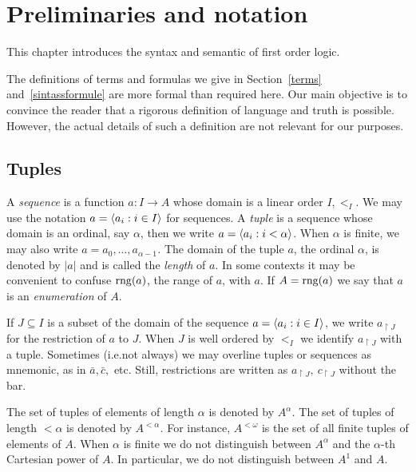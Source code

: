 \chapter{Preliminaries and notation}\label{termini}
This chapter introduces the syntax and semantic of first order logic.

The definitions of terms and formulas we give in Section~\ref{terms} and~\ref{sintassformule} are more formal than required here.
Our main objective is to convince the reader that a rigorous definition of language and truth is possible.
However, the actual details of such a definition are not relevant for our purposes.



\section{Tuples}

A \emph{sequence\/} is a function  $a:I\to A$ whose domain is a linear order $I,<_I$.
We may use the notation \emph{$a=\langle a_i: i\in I\rangle$} for sequences.
A \emph{tuple\/} is a sequence whose domain is an ordinal, say $\alpha$, then we write  $a=\langle a_i: i<\alpha\rangle$.
When $\alpha$ is finite, we may also write \emph{$a=a_0,\dots,a_{\alpha-1}$.}
The domain of the tuple $a$, the ordinal $\alpha$, is denoted by \emph{$|a|$\/} and is called the \emph{length\/} of $a$.
In some contexts it may be convenient to confuse $\mathop{\rm rng}(a)$, the range of $a$, with $a$.
If $A=\mathop{\rm rng}(a)$ we say that $a$ is an \emph{enumeration\/} of $A$.

If $J\subseteq I$ is a subset of the domain of the sequence $a=\langle a_i: i\in I\rangle$, we write  \emph{$a_{\restriction J}$} for the restriction of $a$ to $J$.
When $J$ is well ordered by $<_I$ we identify $a_{\restriction J}$ with a tuple.
\noindent\llap{\textcolor{red}{\Large\warning}\kern1.5ex}%
Sometimes (i.e.\@ not always) we may overline tuples or sequences as mnemonic, as in $\bar a,\bar c,$ etc.
Still, restrictions are written as $a_{\restriction J},\ c_{\restriction J}$ without the bar.

The set of tuples of elements of length $\alpha$ is denoted by \emph{$A^\alpha$.}
The set of tuples of length $<\alpha$ is denoted by \emph{$A^{<\alpha}$.}
For instance, \emph{$A^{<\omega}$\/} is the set of all finite tuples of elements of $A$.
When $\alpha$ is finite we do not distinguish between $A^\alpha$ and the $\alpha$-th Cartesian power of $A$.
In particular, we do not distinguish between $A^1$ and $A$.

